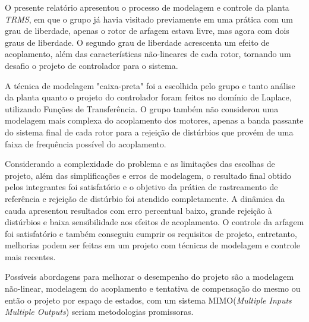 
O presente relatório apresentou o processo de modelagem e controle da planta \textit{TRMS}, em que o grupo já havia visitado previamente em uma prática com um grau de liberdade, apenas o rotor de arfagem estava livre, mas agora com dois graus de liberdade. O segundo grau de liberdade acrescenta um efeito de acoplamento, além das características não-lineares de cada rotor, tornando um desafio o projeto de controlador para o sistema.

A técnica de modelagem "caixa-preta" foi a escolhida pelo grupo e tanto análise da planta quanto o projeto do controlador foram feitos no domínio de Laplace, utilizando Funções de Transferência. O grupo também não considerou uma modelagem mais complexa do acoplamento dos motores, apenas a banda passante do sistema final de cada rotor para a rejeição de distúrbios que provém de uma faixa de frequência possível do acoplamento. 

Considerando a complexidade do problema e as limitações das escolhas de projeto, além das simplificações e erros de modelagem, o resultado final obtido pelos integrantes foi satisfatório e o objetivo da prática de rastreamento de referência e rejeição de distúrbio foi atendido completamente. A dinâmica da cauda apresentou resultados com erro percentual baixo, grande rejeição à distúrbios e baixa sensibilidade aos efeitos de acoplamento. O controle da arfagem foi satisfatório e também conseguiu cumprir os requisitos de projeto, entretanto, melhorias podem ser feitas em um projeto com técnicas de modelagem e controle mais recentes.

Possíveis abordagens para melhorar o desempenho do projeto são a modelagem não-linear, modelagem do acoplamento e tentativa de compensação do mesmo ou então o projeto por espaço de estados, com um sistema MIMO(\textit{Multiple Inputs Multiple Outputs}) seriam metodologias promissoras.
